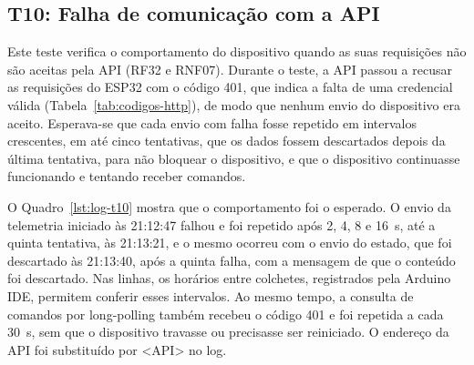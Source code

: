 \subsection{T10: Falha de comunicação com a API}

Este teste verifica o comportamento do dispositivo quando as suas requisições não são aceitas pela API (RF32 e RNF07). Durante o teste, a API passou a recusar as requisições do ESP32 com o código 401, que indica a falta de uma credencial válida (Tabela~\ref{tab:codigos-http}), de modo que nenhum envio do dispositivo era aceito. %
Esperava-se que cada envio com falha fosse repetido em intervalos crescentes, em até cinco tentativas, que os dados fossem descartados depois da última tentativa, para não bloquear o dispositivo, e que o dispositivo continuasse funcionando e tentando receber comandos.

O Quadro~\ref{lst:log-t10} mostra que o comportamento foi o esperado. O envio da telemetria iniciado às 21:12:47 falhou e foi repetido após 2, 4, 8 e 16~s, até a quinta tentativa, às 21:13:21, e o mesmo ocorreu com o envio do estado, que foi descartado às 21:13:40, após a quinta falha, com a mensagem de que o conteúdo foi descartado. Nas linhas, os horários entre colchetes, registrados pela Arduino IDE, permitem conferir esses intervalos. Ao mesmo tempo, a consulta de comandos por long-polling também recebeu o código 401 e foi repetida a cada 30~s, sem que o dispositivo travasse ou precisasse ser reiniciado. O endereço da API foi substituído por <API> no log.

